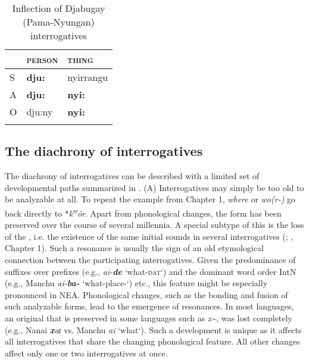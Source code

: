 \begin{table}
\caption{Inflection of Djabugay (Pama-Nyungan) interrogatives \citep[135]{Nau1999}}
\label{tab:4:10}

\begin{tabularx}{\textwidth}{XXl}
\lsptoprule
& \textsc{person} & \textsc{thing}\\
\midrule
S & \textbf{dju:} & nyirrangu\\
A & \textbf{dju:} & \textbf{nyi:}\\
O & dju:ny & \textbf{nyi:}\\
\lspbottomrule
\end{tabularx}
\end{table}

\subsection{The diachrony of interrogatives}\label{sec:4.3.3}

The diachrony of interrogatives can be described with a limited set of developmental paths summarized in . (A) Interrogatives may simply be too old to be analyzable at all. To repeat the example from Chapter 1,  \textit{where} or  \textit{wo(r-)} go back directly to  *\textit{k\textsuperscript{w}}\textit{ór}. Apart from phonological changes, the form has been preserved over the course of several millennia. A special subtype of this is the loss of the , i.e. the existence of the same initial sounds in several interrogatives (\citealt{BickelNichols2007}; \citealt{Mackenzie2009}, Chapter 1). Such a resonance is usually the sign of an old etymological connection between the participating interrogatives. Given the predominance of suffixes over prefixes (e.g.,  \textit{ai-\textbf{de}} ‘what-\textsc{dat}‘) and the dominant word order IntN (e.g., Manchu \textit{ai-\textbf{ba-}} ‘what-place-‘) etc., this feature might be especially pronounced in NEA. Phonological changes, such as the bonding and fusion of such analyzable forms, lead to the emergence of resonances. In most  languages, an original  that is preserved in some languages such as  \textit{x{\textasciitilde}}, was lost completely (e.g., Nanai \textit{\textbf{x}aɪ} vs. Manchu \textit{ai} ‘what‘). Such a development is unique as it affects all interrogatives that share the changing phonological feature. All other changes affect only one or two interrogatives at once.


